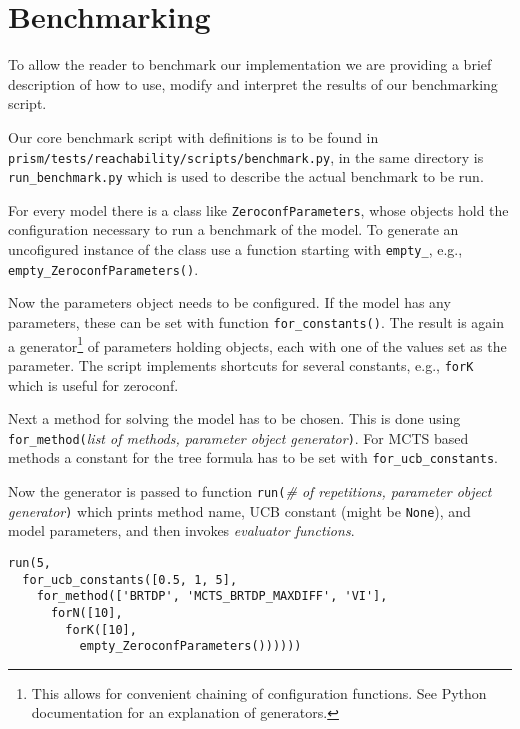\chapter{Benchmarking}

To allow the reader to benchmark our implementation we are providing a
brief description of how to use, modify and interpret the results of
our benchmarking script.

Our core benchmark script with definitions is to be found in \linebreak
\verb|prism/tests/reachability/scripts/benchmark.py|, in the same
directory is \verb|run_benchmark.py| which is used to describe the
actual benchmark to be run.

For every model there is a class like \verb|ZeroconfParameters|, whose
objects hold the configuration necessary to run a benchmark of the model.
To generate an uncofigured instance of the class use a function starting
with \verb|empty_|, e.g., \verb|empty_ZeroconfParameters()|.

Now the parameters object needs to be configured. If the model
has any parameters, these can be set with function
\verb|for_constants(|\verb|)|.
The result is again a generator\footnote{This allows for convenient
    chaining of configuration functions. See
Python documentation for an explanation of generators.} of parameters
holding objects, each with one of the values set as the parameter. The script
implements shortcuts for several constants, e.g., \verb|forK| which is
useful for zeroconf.

Next a method for solving the model has to be chosen. This is done using
\verb|for_method(|{\em list of methods, parameter object
generator}\verb|)|. For MCTS based methods a constant for the tree
formula has to be set with \verb|for_ucb_constants|.

Now the generator is passed to function \verb|run(|{\em \# of
repetitions, parameter object generator}\verb|)| which prints method
name, UCB constant (might be \verb|None|), and model parameters, and
then invokes {\em evaluator functions}.

\begin{verbatim}
run(5,
  for_ucb_constants([0.5, 1, 5],
    for_method(['BRTDP', 'MCTS_BRTDP_MAXDIFF', 'VI'],
      forN([10],
        forK([10],
          empty_ZeroconfParameters())))))
\end{verbatim}

